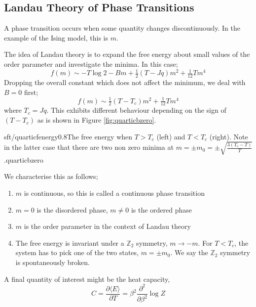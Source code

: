 \subsection{Landau Theory of Phase Transitions}
\begin{definitionbox}
A phase transition occurs when some quantity changes discontinuously. In the example of the Ising model, this is $m$.
\end{definitionbox}
The idea of Landau theory is to expand the free energy about small values of the order parameter and investigate the minima. In this case;
\begin{equation}
f(m) \sim -T \log 2 - B m + \tfrac{1}{2}\left( T - J q \right) m^2 + \tfrac{1}{12} T m^4
\end{equation}
Dropping the overall constant which does not affect the minimum, we deal with $B=0$ first;
\begin{equation}
f(m) \sim \tfrac{1}{2} \left( T - T_c \right) m^2 + \tfrac{1}{12} T m^4
\end{equation}
where $T_c = J q$. This exhibits different behaviour depending on the sign of $\left( T - T_c \right)$ as is shown in Figure \ref{fig:quarticbzero}.
\begin{mygraphic}{sft/quarticfenergy}{0.8}{The free energy when $T > T_c$ (left) and $T < T_c$ (right). Note in the latter case that there are two non zero minima at $m = \pm m_0 = \pm \sqrt{ \tfrac{3(T_c - T)}{T} }$.}{quarticbzero}\end{mygraphic}
We characterise this as follows;
\begin{enumerate}
\item $m$ is continuous, so this is called a continuous phase transition
\item $m = 0$ is the disordered phase, $m \neq 0$ is the ordered phase
\item $m$ is the order parameter in the context of Landau theory
\item The free energy is invariant under a $\mathbb{Z}_2$ symmetry, $m \rightarrow -m$. For $T < T_c$, the system has to pick one of the two states, $m = \pm m_0$. We say the $\mathbb{Z}_2$ symmetry is spontaneously broken.
\end{enumerate}
A final quantity of interest might be the heat capacity,
\begin{equation*}
C = \frac{\partial \langle E \rangle}{\partial T} = \beta^2 \frac{\partial^2}{\partial \beta^2} \log Z
\end{equation*}
